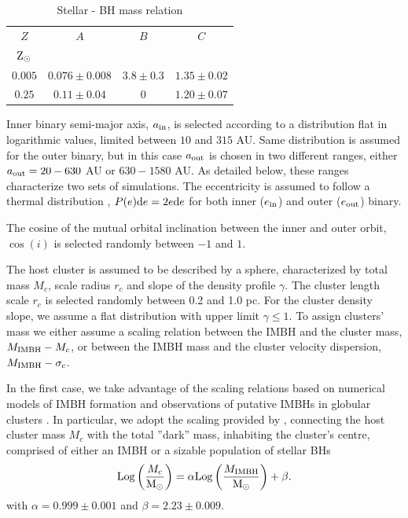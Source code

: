 \documentclass[useAMS,usenatbib]{mn2e}
\newcommand{\Log}{{\rm Log}}
\newcommand{\Ms}{{\rm M}_\odot}
\newcommand{\Zs}{{\rm Z}_\odot}
\newcommand{\ibh}{{\rm IMBH}}
\newcommand{\inn}{{\rm in}}
\newcommand{\out}{{\rm out}}
\begin{document}
\begin{table}
    \centering
    \caption{Stellar - BH mass relation}
    \begin{tabular}{cccc}
        \hline
        \hline
        $Z$ & $A$ & $B$ & $C$ \\
        $\Zs$   &  & &  \\
    \hline    
        $0.005 $& $0.076\pm0.008$ & $3.8\pm0.3$ & $1.35\pm0.02$\\
        $0.25$  & $0.11\pm0.04$   & $0  $       & $1.20\pm0.07$\\
    \hline
    \end{tabular}
    \label{tab:t1}
\end{table}

Inner binary semi-major axis, $a_\inn$, is selected according to a distribution flat in logarithmic values, limited between $10$ and $315$ AU. Same distribution is assumed for the outer binary, but in this case $a_\out$ is chosen in two different ranges, either $a_\out=20-630$ AU or $630-1580$ AU. As detailed below, these ranges characterize two sets of simulations.
The eccentricity is assumed to follow a thermal distribution \citep{jeans19}, $P(e){\rm d}e = 2e{\rm d}e$ for both inner ($e_\inn$) and outer ($e_\out$) binary.

The cosine of the mutual orbital inclination between the inner and outer orbit, $\cos(i)$ is selected randomly between $-1$ and $1$.

The host cluster is assumed to be described by a \cite{Deh93} sphere, characterized by 
total mass $M_c$, scale radius $r_c$ and slope of the density profile $\gamma$.
The cluster length scale $r_c$ is selected randomly between 0.2 and 1.0 pc. For the cluster density slope, we assume a flat distribution with upper limit $\gamma \leq 1$.
To assign clusters' mass we either assume a scaling relation between the IMBH and the cluster mass, $M_\ibh - M_c$, or between the IMBH mass and the cluster velocity dispersion, $M_\ibh-\sigma_c$. 

In the first case, we take advantage of the scaling relations based on numerical models of IMBH formation and observations of putative IMBHs in globular clusters \citep{zwart02,Lutzgendorf13,AS16}. In particular, we adopt the scaling provided by \cite{AS16}, connecting the host cluster mass $M_c$ with the total ''dark'' mass, inhabiting the cluster's centre, comprised of either an IMBH or a sizable population of stellar BHs
\begin{equation}
\Log \left(\frac{M_c}{\Ms}\right) = \alpha \Log \left(\frac{M_\ibh}{\Ms}\right) + \beta.
\label{mcmibh}
\end{equation}
with $\alpha = 0.999 \pm 0.001$ and $\beta = 2.23 \pm 0.009$. 
\end{document}

